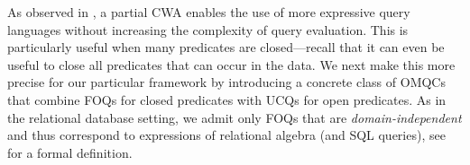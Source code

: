 \documentclass{lmcs}
\theoremstyle{definition}
\begin{document}
%
As observed in \cite{reiter92what,calvanese07eql}, a partial CWA
enables the use of more expressive query languages without increasing
the complexity of query evaluation. This is particularly useful when
many predicates are closed---recall that it can even be useful to
close all predicates that can occur in the data. We next make this more
precise for our particular framework by introducing a concrete class of
OMQCs that combine FOQs for closed predicates with UCQs for open
predicates. As in the relational database setting, we admit only FOQs
that are \emph{domain-independent} and thus correspond to expressions
of relational algebra (and SQL queries), see
\cite{abiteboul95foundations} for a formal
definition. %

%
\end{document}
